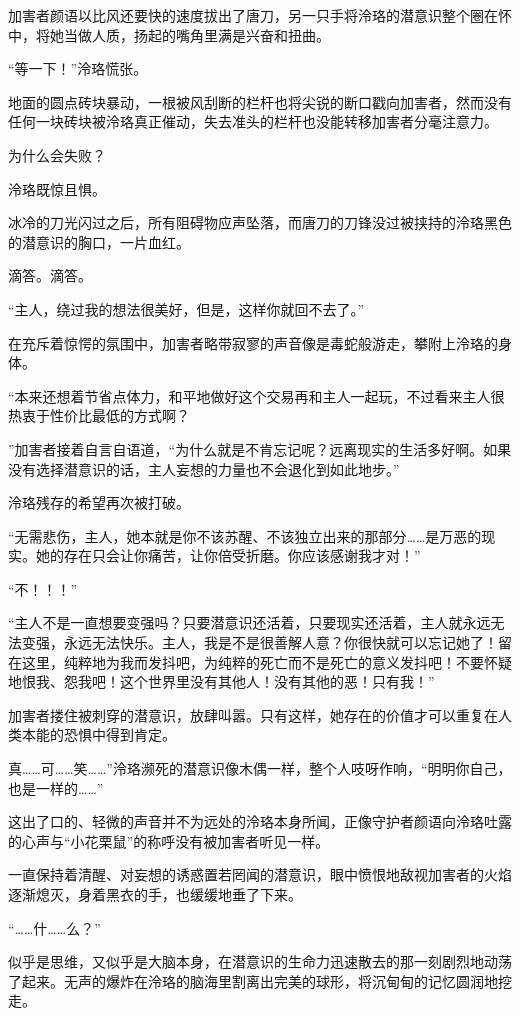 \documentclass[UTF8, scheme = chinese, openany]{ctexbook}
\begin{document}
加害者颜语以比风还要快的速度拔出了唐刀，另一只手将泠珞的潜意识整个圈在怀中，将她当做人质，扬起的嘴角里满是兴奋和扭曲。

“等一下！”泠珞慌张。

地面的圆点砖块暴动，一根被风刮断的栏杆也将尖锐的断口戳向加害者，然而没有任何一块砖块被泠珞真正催动，失去准头的栏杆也没能转移加害者分毫注意力。

为什么会失败？

泠珞既惊且惧。

冰冷的刀光闪过之后，所有阻碍物应声坠落，而唐刀的刀锋没过被挟持的泠珞黑色的潜意识的胸口，一片血红。

滴答。滴答。

“主人，绕过我的想法很美好，但是，这样你就回不去了。”

在充斥着惊愕的氛围中，加害者略带寂寥的声音像是毒蛇般游走，攀附上泠珞的身体。

“本来还想着节省点体力，和平地做好这个交易再和主人一起玩，不过看来主人很热衷于性价比最低的方式啊？

”加害者接着自言自语道，“为什么就是不肯忘记呢？远离现实的生活多好啊。如果没有选择潜意识的话，主人妄想的力量也不会退化到如此地步。”

泠珞残存的希望再次被打破。

“无需悲伤，主人，她本就是你不该苏醒、不该独立出来的那部分……是万恶的现实。她的存在只会让你痛苦，让你倍受折磨。你应该感谢我才对！”

“不！！！”

“主人不是一直想要变强吗？只要潜意识还活着，只要现实还活着，主人就永远无法变强，永远无法快乐。主人，我是不是很善解人意？你很快就可以忘记她了！留在这里，纯粹地为我而发抖吧，为纯粹的死亡而不是死亡的意义发抖吧！不要怀疑地恨我、怨我吧！这个世界里没有其他人！没有其他的恶！只有我！”

加害者搂住被刺穿的潜意识，放肆叫嚣。只有这样，她存在的价值才可以重复在人类本能的恐惧中得到肯定。

真……可……笑……”泠珞濒死的潜意识像木偶一样，整个人吱呀作响，“明明你自己，也是一样的……”

这出了口的、轻微的声音并不为远处的泠珞本身所闻，正像守护者颜语向泠珞吐露的心声与“小花栗鼠”的称呼没有被加害者听见一样。

一直保持着清醒、对妄想的诱惑置若罔闻的潜意识，眼中愤恨地敌视加害者的火焰逐渐熄灭，身着黑衣的手，也缓缓地垂了下来。

\vspace{1.5em}

“……什……么？”

似乎是思维，又似乎是大脑本身，在潜意识的生命力迅速散去的那一刻剧烈地动荡了起来。无声的爆炸在泠珞的脑海里割离出完美的球形，将沉甸甸的记忆圆润地挖走。
\end{document}
